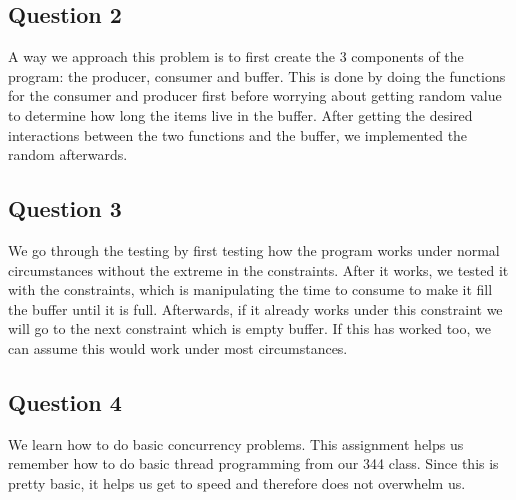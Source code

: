 \documentclass[10pt,draftclsnofoot,onecolumn, compsoc]{IEEEtran}
\begin{document}
\subsection{Question 2}
A way we approach this problem is to first create the 3 components of the program: the producer, consumer and buffer. This is done by doing the functions for the consumer and producer first before worrying about getting random value to determine how long the items live in the buffer. After getting the desired interactions between the two functions and the buffer, we implemented the random afterwards. 
\subsection{Question 3}
We go through the testing by first testing how the program works under normal circumstances without the extreme in the constraints. After it works, we tested it with the constraints, which is manipulating the time to consume to make it fill the buffer until it is full. Afterwards, if it already works under this constraint we will go to the next constraint which is empty buffer. If this has worked too, we can assume this would work under most circumstances.
\subsection{Question 4}
We learn how to do basic concurrency problems. This assignment helps us remember how to do basic thread programming from our 344 class. Since this is pretty basic, it helps us get to speed and therefore does not overwhelm us. 
\end{document}
